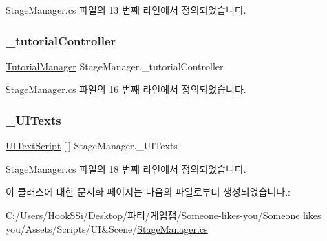 Stage\+Manager.\+cs 파일의 13 번째 라인에서 정의되었습니다.

\mbox{\label{class_stage_manager_a89bcfa1a4d5ca6a9135dfe051b4695a8}} 
\subsubsection{\texorpdfstring{\_tutorialController}{\_tutorialController}}
{\footnotesize\ttfamily \mbox{\hyperlink{class_tutorial_manager}{Tutorial\+Manager}} Stage\+Manager.\+\_\+tutorial\+Controller\hspace{0.3cm}{\ttfamily [private]}}



Stage\+Manager.\+cs 파일의 16 번째 라인에서 정의되었습니다.

\mbox{\label{class_stage_manager_a50700b1afb580935b19b70cb70e404dd}} 
\subsubsection{\texorpdfstring{\_UITexts}{\_UITexts}}
{\footnotesize\ttfamily \mbox{\hyperlink{class_u_i_text_script}{U\+I\+Text\+Script}} \mbox{[}$\,$\mbox{]} Stage\+Manager.\+\_\+\+U\+I\+Texts}



Stage\+Manager.\+cs 파일의 18 번째 라인에서 정의되었습니다.



이 클래스에 대한 문서화 페이지는 다음의 파일로부터 생성되었습니다.\+:\begin{DoxyCompactItemize}
\item 
C\+:/\+Users/\+Hook\+S\+Si/\+Desktop/파티/게임잼/\+Someone-\/likes-\/you/\+Someone likes you/\+Assets/\+Scripts/\+U\+I\&\+Scene/\mbox{\hyperlink{_stage_manager_8cs}{Stage\+Manager.\+cs}}\end{DoxyCompactItemize}
